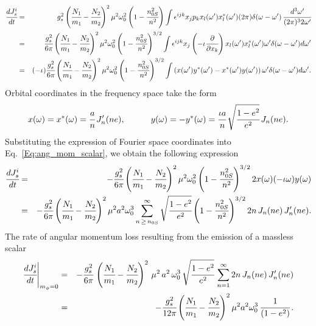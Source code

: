 \documentclass[aps,prd]{revtex4-2}
\begin{document}
\begin{eqnarray}\label{Eq:ang_mom_scalar}
    \cfrac{dJ^{i}_{s}}{dt} &=& g_{s}^{2} \left(\cfrac{N_{1}}{m_{1}} - \cfrac{N_{2}}{m_{2}}\right)^2 \mu^2 \omega_{0}^2 \left(1- \cfrac{n_{0S}^2}{n^2}\right)\int \epsilon^{ijk} x_{j} p_{k} x_{l}(\omega^{\prime}) x_{l}^{*}(\omega^{\prime}) (2\pi) \delta (\omega -\omega^{\prime})\,\cfrac{d^{3}\omega^{\prime}}{(2\pi)^3 2\omega^{\prime}}\nonumber \\
    &=& \cfrac{g_{s}^2}{6\pi} \left(\cfrac{N_{1}}{m_{1}} - \cfrac{N_{2}}{m_{2}}\right)^2 \mu^2 \omega_{0}^2 \left(1- \cfrac{n_{0S}^2}{n^2}\right)^{3/2}\int \epsilon^{ijk} x_{j} \left(-\iota\cfrac{\partial}{\partial x_{k}}\right)x_{l}(\omega^{\prime}) x_{l}^{*}(\omega^{\prime}) \omega^{\prime} \delta(\omega-\omega^{\prime}) d\omega^{\prime}\nonumber \\
    & =& (-\iota)\cfrac{g_{s}^2}{6\pi} \left(\cfrac{N_{1}}{m_{1}} - \cfrac{N_{2}}{m_{2}}\right)^2 \mu^2 \omega_{0}^2 \left(1- \cfrac{n_{0S}^2}{n^2}\right)^{3/2}\int \left(x(\omega^{\prime}) y^{*}(\omega^{\prime}) - x^{*}(\omega^{\prime}) y(\omega^{\prime})\right) \omega^{\prime} \delta(\omega - \omega^{\prime}) d\omega^{\prime}.
\end{eqnarray}
Orbital coordinates in the frequency space take the form
\begin{eqnarray}\label{Eq:fourier_co_ord}
    x(\omega) = x^{*}(\omega) = \cfrac{a}{n}\,J_{n}^{\prime}(ne), \quad\qquad y(\omega) = -y^{*}(\omega) = \cfrac{\iota a}{n}\,\sqrt{\cfrac{1-e^2}{e^2}}\,J_{n}(ne).
\end{eqnarray}
Substituting the expression of Fourier space coordinates into Eq.~\eqref{Eq:ang_mom_scalar}, we obtain the following expression
\begin{eqnarray}\label{dJS}
    \cfrac{dJ^{i}_{s}}{dt} &=& -\cfrac{g_{s}^2}{6\pi} \left(\cfrac{N_{1}}{m_{1}}-\cfrac{N_{2}}{m_{2}}\right)^2 \mu^2 \omega_{0}^2 \left(1- \cfrac{n_{0S}^2}{n^2}\right)^{3/2} 2 x(\omega) (-\iota \omega) y(\omega) 
    \nonumber\\ &=&-\cfrac{g_{s}^2}{6\pi} \left(\cfrac{N_{1}}{m_{1}}-\cfrac{N_{2}}{m_{2}}\right)^2 \mu^2 a^2 \omega_{0}^3   \sum_{n\,\geq\,n_{0S}}^{\infty} \sqrt{\cfrac{1-e^2}{e^2}} \left(1- \cfrac{n_{0S}^2}{n^2}\right)^{3/2}2n\,J_{n}(ne)\,J_{n}^{\prime}(ne).
\end{eqnarray}
The rate of angular momentum loss resulting from the emission of a massless scalar
\begin{eqnarray}
    \cfrac{dJ_{s}^{i}}{dt}\Bigg|_{m_{\phi}=0}&=&-\cfrac{g_{s}^2}{6\pi}\,\left(\cfrac{N_{1}}{m_{1}}-\cfrac{N_{2}}{m_{2}}\right)^2\,\mu^2\,a^2\,\omega_{0}^3\,\sqrt{\cfrac{1-e^2}{e^2}}\,\sum_{n=1}^{\infty}2n\,J_{n}(ne)\,J_{n}^{\prime}(ne)\nonumber \\
    &=&- \cfrac{g_{s}^2}{12\pi} \left(\cfrac{N_{1}}{m_{1}}-\cfrac{N_{2}}{m_{2}}\right)^2 \mu^2 a^2 \omega_{0}^3\,\cfrac{1}{(1-e^2)}\,.
\end{eqnarray}
\end{document}
